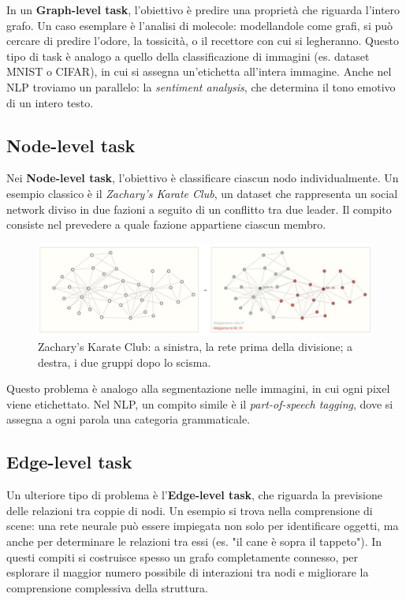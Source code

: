 In un \textbf{Graph-level task}, l’obiettivo è predire una proprietà che riguarda l’intero grafo. Un caso esemplare è l’analisi di molecole: modellandole come grafi, si può cercare di predire l’odore, la tossicità, o il recettore con cui si legheranno. Questo tipo di task è analogo a quello della classificazione di immagini (es. dataset MNIST o CIFAR), in cui si assegna un’etichetta all’intera immagine. Anche nel NLP troviamo un parallelo: la \textit{sentiment analysis}, che determina il tono emotivo di un intero testo.

\subsection{Node-level task}

Nei \textbf{Node-level task}, l’obiettivo è classificare ciascun nodo individualmente. Un esempio classico è il \textit{Zachary’s Karate Club}, un dataset che rappresenta un social network diviso in due fazioni a seguito di un conflitto tra due leader. Il compito consiste nel prevedere a quale fazione appartiene ciascun membro.
\begin{figure}
    \centering
    \includegraphics[width=\textwidth]{figure/ZachsKarateClubProblem.png}
    \caption{Zachary’s Karate Club: a sinistra, la rete prima della divisione; a destra, i due gruppi dopo lo scisma.}
    \label{fig:ZKCProblem}
\end{figure}
Questo problema è analogo alla segmentazione nelle immagini, in cui ogni pixel viene etichettato. Nel NLP, un compito simile è il \textit{part-of-speech tagging}, dove si assegna a ogni parola una categoria grammaticale.

\subsection{Edge-level task}

Un ulteriore tipo di problema è l’\textbf{Edge-level task}, che riguarda la previsione delle relazioni tra coppie di nodi. Un esempio si trova nella comprensione di scene: una rete neurale può essere impiegata non solo per identificare oggetti, ma anche per determinare le relazioni tra essi (es. "il cane è sopra il tappeto"). In questi compiti si costruisce spesso un grafo completamente connesso, per esplorare il maggior numero possibile di interazioni tra nodi e migliorare la comprensione complessiva della struttura.

